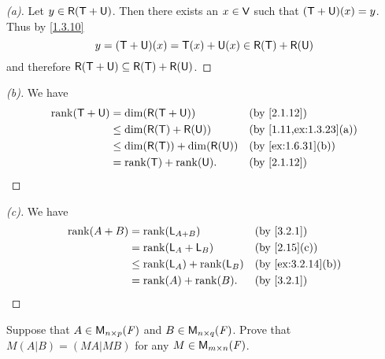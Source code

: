 \begin{proof}[(a)]
	Let \(y \in \rg{\T + \U}\).
	Then there exists an \(x \in \mathsf{V}\) such that \((\mathsf{T} + \mathsf{U})(x) = y\).
	Thus by \cref{1.3.10}
	\[
		y = (\T + \U)(x) = \T(x) + \U(x) \in \rg{\T} + \rg{\U}
	\]
	and therefore \(\rg{\T + \U} \subseteq \rg{\T} + \rg{\U}\).
\end{proof}

\begin{proof}[(b)]
	We have
	\begin{align*}
		\rk{\T + \U} & = \dim(\rg{\T + \U})               &  & \by{2.1.12}            \\
		             & \leq \dim(\rg{\T} + \rg{\U})       &  & \by{1.11,ex:1.3.23}[a] \\
		             & \leq \dim(\rg{\T}) + \dim(\rg{\U}) &  & \by{ex:1.6.31}[b]      \\
		             & = \rk{\T} + \rk{\U}.               &  & \by{2.1.12}
	\end{align*}
\end{proof}

\begin{proof}[(c)]
	We have
	\begin{align*}
		\rk{A + B} & = \rk{\L_{A + B}}          &  & \by{3.2.1}        \\
		           & = \rk{\L_A + \L_B}         &  & \by{2.15}[c]      \\
		           & \leq \rk{\L_A} + \rk{\L_B} &  & \by{ex:3.2.14}[b] \\
		           & = \rk{A} + \rk{B}.         &  & \by{3.2.1}
	\end{align*}
\end{proof}

\begin{ex}\label{ex:3.2.15}
	Suppose that \(A \in \mathsf{M}_{{n} \times p}({\mathit{F}})\) and \(B \in \mathsf{M}_{{n} \times q}({\mathit{F}})\).
	Prove that \(M (A | B) = (MA | MB)\) for any \(M \in \mathsf{M}_{{m} \times n}({\mathit{F}})\).
\end{ex}

